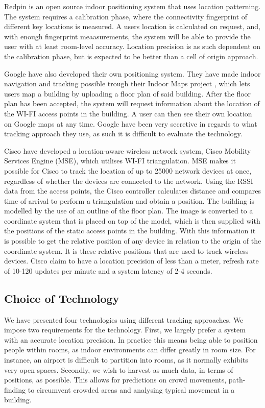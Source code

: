 Redpin is an open source indoor positioning system that uses location patterning. The system requires a calibration phase, where the connectivity fingerprint of different key locations is measured. A users location is calculated on request, and, with enough fingerprint meaasurements, the system will be able to provide the user with at least room-level accuracy\cite{redpin}. Location precision is as such dependent on the calibration phase, but is expected to be better than a cell of origin approach. 

Google have also developed their own positioning system. They have made indoor navigation and tracking possible trough their Indoor Maps project \cite{IPSoverGPS}, which lets users map a building by uploading a floor plan of said building. After the floor plan has been accepted, the system will request information about the location of the WI-FI access points in the building\cite{googleindoormaps}. A user can then see their own location on Google maps at any time. Google have been very secretive in regards to what tracking approach they use, as such it is difficult to evaluate the technology.

Cisco have developed a location-aware wireless network system, Cisco Mobility Services Engine (MSE), which utilises WI-FI triangulation\cite{CiscoTri}. MSE makes it possible for Cisco to track the location of up to 25000 network devices at once, regardless of whether the devices are connected to the network. Using the RSSI data from the access points, the Cisco controller calculates distance and compares time of arrival to perform a triangulation and obtain a position\cite{ciscoMSE}.
The building is modelled by the use of an outline of the floor plan. The image is converted to a coordinate system that is placed on top of the model, which is then supplied with the positions of the static access points in the building. With this information it is possible to get the relative position of any device in relation to the origin of the coordinate system. It is these relative positions that are used to track wireless devices.
Cisco claim to have a location precision of less than a meter, refresh rate of 10-120 updates per minute and a system latency of 2-4 seconds\cite{dimensions}. 

\subsection{Choice of Technology}\label{subsec:cisco}
We have presented four technologies using different tracking approaches. We impose two requirements for the technology. First, we largely prefer a system with an accurate location precision. In practice this means being able to position people within rooms, as indoor environments can differ greatly in room size. For instance, an airport is difficult to partition into rooms, as it normally exhibits very open spaces. Secondly, we wish to harvest as much data, in terms of positions, as possible. This allows for predictions on crowd movements, path-finding to circumvent crowded areas and analysing typical movement in a building. 

